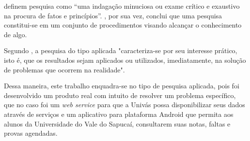 	
	\par {} definem pesquisa como “uma indagação minuciosa
ou exame crítico e exaustivo na procura de fatos e princípios”.
, por sua vez, conclui que uma pesquisa constitui-se
em um conjunto de procedimentos visando alcançar o conhecimento de algo.

	\par Segundo , a pesquisa do tipo aplicada
"caracteriza-se por seu interesse prático, isto é, que os resultados sejam
aplicados ou utilizados, imediatamente, na solução de problemas que ocorrem na
realidade".

	\par Dessa maneira, este trabalho enquadra-se no tipo de pesquisa aplicada,
pois foi desenvolvido um produto real com intuito de resolver um problema
específico, que no caso foi um \textit{web service} para que a Univás possa
disponibilizar seus dados através de serviços e um aplicativo para plataforma
Android que permita aos alunos da Universidade do Vale do Sapucaí, consultarem
suas notas, faltas e provas agendadas.
